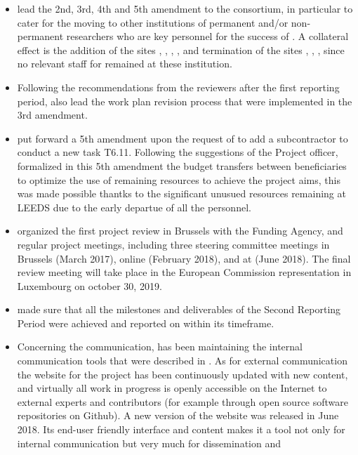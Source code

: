 \begin{itemize}
\item {} lead the 2nd, 3rd, 4th and 5th amendment to the consortium,
  in particular to cater for the moving to other institutions of
  permanent and/or non-permanent researchers who are key personnel for
  the success of \ODK. A collateral effect is the addition of the
  sites , , , , and termination of the
  sites , , ,  
  since no relevant staff for \ODK remained at these institution.
\item Following the recommendations from the reviewers after the first
  reporting period,  also lead the work plan revision process
  that were implemented in the 3rd amendment.
\item {} put forward a 5th amendment upon the request of 
to add a subcontractor to conduct a new task T6.11. 
Following the suggestions of the Project officer,  formalized 
in this 5th amendment the budget transfers between beneficiaries to optimize 
the use of remaining resources to achieve the project aims, this was made possible thantks to
the significant unusued resources remaining at LEEDS due to the early departue of all the personnel. 
\item {} organized the first project review in Brussels with
  the Funding Agency, and regular project meetings, including three
  steering committee meetings in Brussels (March 2017), online
  (February 2018), and at  (June 2018). The final review meeting will take place
  in the European Commission representation in Luxembourg on october 30, 2019.
\item {} made sure that all the milestones and deliverables of
  the Second Reporting Period were achieved and reported on within its
  timeframe.
\item Concerning the communication,  has been maintaining the
  internal communication tools that were described in
  . As for external
  communication the website for the project has been continuously
  updated with new content, and virtually all work in progress is
  openly accessible on the Internet to external experts and
  contributors (for example through open source software repositories
  on Github). A new version of the website was released in June 2018.
  Its end-user friendly interface and content makes it a tool not only
  for internal communication but very much for dissemination and

\end{itemize}
